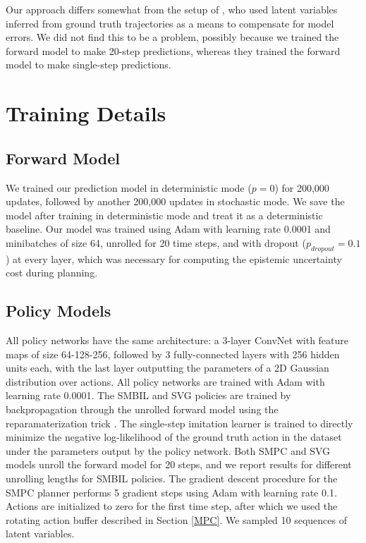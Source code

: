\documentclass{article} %
\begin{document}
    Our approach differs somewhat from the setup of \citep{SVG}, who used latent variables inferred from ground truth trajectories as a means to compensate for model errors. We did not find this to be a problem, possibly because we trained the forward model to make 20-step predictions, whereas they trained the forward model to make single-step predictions.



    \section{Training Details}
    \label{training-details-appendix}

    \subsection{Forward Model}
    We trained our prediction model in deterministic mode ($p=0$) for 200,000 updates, followed by another 200,000 updates in stochastic mode.
    We save the model after training in deterministic mode and treat it as a deterministic baseline.
    Our model was trained using Adam \citep{ADAM} with learning rate 0.0001 and minibatches of size 64, unrolled for 20 time steps, and with dropout ($p_{dropout}=0.1$) at every layer, which was necessary for computing the epistemic uncertainty cost during planning.

    \subsection{Policy Models}

    All policy networks have the same architecture: a 3-layer ConvNet with feature maps of size 64-128-256, followed by 3 fully-connected layers with 256 hidden units each, with the last layer outputting the parameters of a 2D Gaussian distribution over actions. All policy networks are trained with Adam with learning rate 0.0001. The SMBIL and SVG policies are trained by backpropagation through the unrolled forward model using the reparamaterization trick \citep{VAE}. The single-step imitation learner is trained to directly minimize the negative log-likelihood of the ground truth action in the dataset under the parameters output by the policy network. Both SMPC and SVG models unroll the forward model for 20 steps, and we report results for different unrolling lengths for SMBIL policies.
    The gradient descent procedure for the SMPC planner performs 5 gradient steps using Adam with learning rate 0.1. Actions are initialized to zero for the first time step, after which we used the rotating action buffer described in Section \ref{MPC}. We sampled 10 sequences of latent variables.
\end{document}
